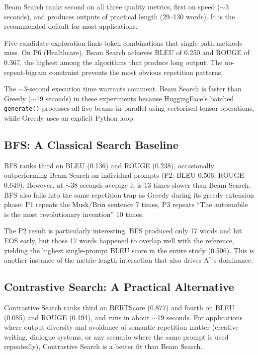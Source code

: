 \documentclass[12pt]{article}
\begin{document}
	Beam Search ranks second on all three quality metrics, first on speed ($\sim$3 seconds), and produces outputs of practical length (29--130 words). It is the recommended default for most applications.
	
	Five-candidate exploration finds token combinations that single-path methods miss. On P6 (Healthcare), Beam Search achieves BLEU of 0.250 and ROUGE of 0.367, the highest among the algorithms that produce long output. The no-repeat-bigram constraint prevents the most obvious repetition patterns.
	
	The $\sim$3-second execution time warrants comment. Beam Search is faster than Greedy ($\sim$19 seconds) in these experiments because HuggingFace's batched \texttt{generate()} processes all five beams in parallel using vectorised tensor operations, while Greedy uses an explicit Python loop.
	
	\subsection{BFS: A Classical Search Baseline}
	\label{sec:bfs_discussion}
	
	BFS ranks third on BLEU (0.136) and ROUGE (0.238), occasionally outperforming Beam Search on individual prompts (P2: BLEU 0.506, ROUGE 0.649). However, at $\sim$38 seconds average it is 13 times slower than Beam Search. BFS also falls into the same repetition trap as Greedy during its greedy extension phase: P1 repeats the Musk/Brin sentence 7 times, P3 repeats ``The automobile is the most revolutionary invention'' 10 times.
	
	The P2 result is particularly interesting. BFS produced only 17 words and hit EOS early, but those 17 words happened to overlap well with the reference, yielding the highest single-prompt BLEU score in the entire study (0.506). This is another instance of the metric-length interaction that also drives A$^*$'s dominance.
	
	\subsection{Contrastive Search: A Practical Alternative}
	\label{sec:contrastive_discussion}
	
	Contrastive Search ranks third on BERTScore (0.877) and fourth on BLEU (0.085) and ROUGE (0.194), and runs in about $\sim$19 seconds. For applications where output diversity and avoidance of semantic repetition matter (creative writing, dialogue systems, or any scenario where the same prompt is used repeatedly), Contrastive Search is a better fit than Beam Search.
	
\end{document}
